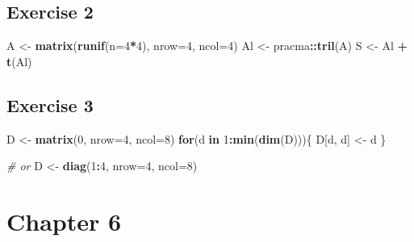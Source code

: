\documentclass[
]{book}
\newenvironment{Shaded}{\begin{snugshade}}{\end{snugshade}}
\newcommand{\CommentTok}[1]{\textcolor[rgb]{0.56,0.35,0.01}{\textit{#1}}}
\newcommand{\ControlFlowTok}[1]{\textcolor[rgb]{0.13,0.29,0.53}{\textbf{#1}}}
\newcommand{\DataTypeTok}[1]{\textcolor[rgb]{0.13,0.29,0.53}{#1}}
\newcommand{\DecValTok}[1]{\textcolor[rgb]{0.00,0.00,0.81}{#1}}
\newcommand{\KeywordTok}[1]{\textcolor[rgb]{0.13,0.29,0.53}{\textbf{#1}}}
\newcommand{\NormalTok}[1]{#1}
\newcommand{\OperatorTok}[1]{\textcolor[rgb]{0.81,0.36,0.00}{\textbf{#1}}}
\newcommand{\StringTok}[1]{\textcolor[rgb]{0.31,0.60,0.02}{#1}}
\begin{document}
\hypertarget{exercise-2-1}{%
\subsection*{Exercise 2}\label{exercise-2-1}}

\begin{Shaded}
\begin{Highlighting}[]
\NormalTok{A \textless{}{-}}\StringTok{ }\KeywordTok{matrix}\NormalTok{(}\KeywordTok{runif}\NormalTok{(}\DataTypeTok{n=}\DecValTok{4}\OperatorTok{*}\DecValTok{4}\NormalTok{), }\DataTypeTok{nrow=}\DecValTok{4}\NormalTok{, }\DataTypeTok{ncol=}\DecValTok{4}\NormalTok{)}
\NormalTok{Al \textless{}{-}}\StringTok{ }\NormalTok{pracma}\OperatorTok{::}\KeywordTok{tril}\NormalTok{(A)}
\NormalTok{S \textless{}{-}}\StringTok{ }\NormalTok{Al }\OperatorTok{+}\StringTok{ }\KeywordTok{t}\NormalTok{(Al)}
\end{Highlighting}
\end{Shaded}

\hypertarget{exercise-3-1}{%
\subsection*{Exercise 3}\label{exercise-3-1}}

\begin{Shaded}
\begin{Highlighting}[]
\NormalTok{D \textless{}{-}}\StringTok{ }\KeywordTok{matrix}\NormalTok{(}\DecValTok{0}\NormalTok{, }\DataTypeTok{nrow=}\DecValTok{4}\NormalTok{, }\DataTypeTok{ncol=}\DecValTok{8}\NormalTok{)}
\ControlFlowTok{for}\NormalTok{(d }\ControlFlowTok{in} \DecValTok{1}\OperatorTok{:}\KeywordTok{min}\NormalTok{(}\KeywordTok{dim}\NormalTok{(D)))\{}
\NormalTok{  D[d, d] \textless{}{-}}\StringTok{ }\NormalTok{d}
\NormalTok{\}}

\CommentTok{\# or}
\NormalTok{D \textless{}{-}}\StringTok{ }\KeywordTok{diag}\NormalTok{(}\DecValTok{1}\OperatorTok{:}\DecValTok{4}\NormalTok{, }\DataTypeTok{nrow=}\DecValTok{4}\NormalTok{, }\DataTypeTok{ncol=}\DecValTok{8}\NormalTok{)}
\end{Highlighting}
\end{Shaded}

\hypertarget{chapter-6-1}{%
\section*{Chapter 6}\label{chapter-6-1}}
\end{document}
